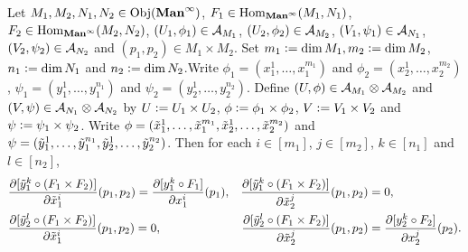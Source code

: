\documentclass{book}
\begin{document}
	\begin{ex} 
		Let $M_1, M_2, N_1, N_2 \in \operatorname{Obj}(\operatorname*{\text{\textbf{Man}}^{\infty}})$, $F_1 \in \operatorname{Hom}_{\operatorname*{\text{\textbf{Man}}^{\infty}}}(M_1, N_1)$, $F_2 \in \operatorname{Hom}_{\operatorname*{\text{\textbf{Man}}^{\infty}}}(M_2, N_2)$, $(U_1, \phi_1) \in \mathcal{A}_{M_1}$, $(U_2, \phi_2) \in \mathcal{A}_{M_2}$, $(V_1, \psi_1) \in \mathcal{A}_{N_1}$, $(V_2, \psi_2) \in \mathcal{A}_{N_2}$ and $(p_1, p_2) \in M_1 \times M_2$. Set $m_1 \vcentcolon= \dim M_1, m_2 \vcentcolon= \dim M_2$, $n_1 \vcentcolon= \dim N_1$ and $n_2 \vcentcolon= \dim N_2$.Write $\phi_1 = (x_1^1, \ldots, x_1^{m_1})$ and $\phi_2 = (x_2^1, \ldots, x_2^{m_2})$, $\psi_1 = (y_1^1, \ldots, y_1^{n_1})$ and $\psi_2 = (y_2^1, \ldots, y_2^{n_2})$. Define $(U, \phi) \in \mathcal{A}_{M_1} \otimes \mathcal{A}_{M_2}$ and $(V, \psi) \in \mathcal{A}_{N_1} \otimes \mathcal{A}_{N_2}$ by $U \vcentcolon= U_1 \times U_2$, $\phi \vcentcolon= \phi_1 \times \phi_2$, $V \vcentcolon= V_1 \times V_2$ and $\psi \vcentcolon= \psi_1 \times \psi_2$. Write $\phi = (\tilde{x}_1^1, \ldots, \tilde{x}_1^{m_1}, \tilde{x}_2^1, \ldots, \tilde{x}_2^{m_2})$ and $\psi = (\tilde{y}_1^1, \ldots, \tilde{y}_1^{n_1}, \tilde{y}_2^1, \ldots, \tilde{y}_2^{n_2})$. Then for each $i \in [m_1]$, $j \in [m_2]$, $k \in [n_1]$ and $l \in [n_2]$,
		\begin{align*}
			& \frac{\partial [\tilde{y}_1^k \circ (F_1 \times F_2)]}{\partial \tilde{x}_1^i}(p_1, p_2) = \frac{\partial [y^k_1 \circ F_1]}{\partial x_1^i} (p_1), 
			& \frac{\partial [\tilde{y}_1^k \circ (F_1 \times F_2)]}{\partial \tilde{x}_2^j}(p_1, p_2) & = 0, \\
			& \frac{\partial [\tilde{y}_2^l \circ (F_1 \times F_2)]}{\partial \tilde{x}_1^i}(p_1, p_2) = 0, 
			& \frac{\partial [\tilde{y}_2^l \circ (F_1 \times F_2)]}{\partial \tilde{x}_2^j}(p_1, p_2) & =  \frac{\partial [y^k_2 \circ F_2]}{\partial x_2^j} (p_2).
		\end{align*}
	\end{ex}
\end{document}
